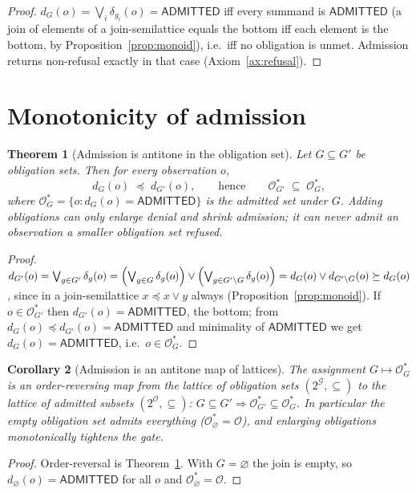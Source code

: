 \documentclass[11pt,oneside]{book}
\theoremstyle{definition}
\theoremstyle{plain}
\newtheorem{theorem}{Theorem}[chapter]
\newtheorem{corollary}[theorem]{Corollary}
\theoremstyle{remark}
\newcommand{\Obs}{\mathcal{O}}                 %
\newcommand{\Adm}{\mathcal{O}^{*}}             %
\newcommand{\Adml}{\mathsf{ADMITTED}}          %
\begin{document}
\begin{proof}
$d_G(o)=\bigvee_i\delta_{g_i}(o)=\Adml$ iff every summand is $\Adml$ (a join of elements of a
join-semilattice equals the bottom iff each element is the bottom, by
Proposition~\ref{prop:monoid}), i.e.\ iff no obligation is unmet. Admission returns
non-refusal exactly in that case (Axiom~\ref{ax:refusal}). \end{proof}

\section{Monotonicity of admission}

\begin{theorem}[Admission is antitone in the obligation set]\label{thm:mono}
Let $G\subseteq G'$ be obligation sets. Then for every observation $o$,
\[
d_G(o)\;\preceq\;d_{G'}(o),\qquad\text{hence}\qquad
\Adm_{G'}\;\subseteq\;\Adm_{G},
\]
where $\Adm_G=\{o:d_G(o)=\Adml\}$ is the admitted set under $G$. Adding obligations can only
enlarge denial and shrink admission; it can never admit an observation a smaller obligation
set refused.
\end{theorem}

\begin{proof}
$d_{G'}(o)=\bigvee_{g\in G'}\delta_g(o)=\Bigl(\bigvee_{g\in G}\delta_g(o)\Bigr)\lor
\Bigl(\bigvee_{g\in G'\setminus G}\delta_g(o)\Bigr)=d_G(o)\lor d_{G'\setminus G}(o)\succeq d_G(o)$,
since in a join-semilattice $x\preceq x\lor y$ always (Proposition~\ref{prop:monoid}). If
$o\in\Adm_{G'}$ then $d_{G'}(o)=\Adml$, the bottom; from $d_G(o)\preceq d_{G'}(o)=\Adml$ and
minimality of $\Adml$ we get $d_G(o)=\Adml$, i.e.\ $o\in\Adm_G$. \end{proof}

\begin{corollary}[Admission is an antitone map of lattices]\label{cor:galois}
The assignment $G\mapsto\Adm_G$ is an order-reversing map from the lattice of obligation sets
$(2^{\mathcal{G}},\subseteq)$ to the lattice of admitted subsets $(2^{\Obs},\subseteq)$:
$G\subseteq G'\Rightarrow\Adm_{G'}\subseteq\Adm_G$. In particular the empty obligation set
admits everything ($\Adm_\varnothing=\Obs$), and enlarging obligations monotonically tightens
the gate.
\end{corollary}

\begin{proof}
Order-reversal is Theorem~\ref{thm:mono}. With $G=\varnothing$ the join is empty, so
$d_\varnothing(o)=\Adml$ for all $o$ and $\Adm_\varnothing=\Obs$. \end{proof}
\end{document}
